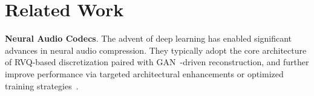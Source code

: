 \documentclass[11pt]{article}
\begin{document}

\section{Related Work}
\label{sec:rel}
\noindent\textbf{Neural Audio Codecs}.
The advent of deep learning has enabled significant advances in neural audio compression. They typically adopt the core architecture of RVQ-based discretization paired with GAN~\cite{goodfellow2014generative}-driven reconstruction, and further improve performance via targeted architectural enhancements or optimized training strategies~\cite{zeghidour2021soundstream, defossez2022high, kumar2023high}.
\end{document}
